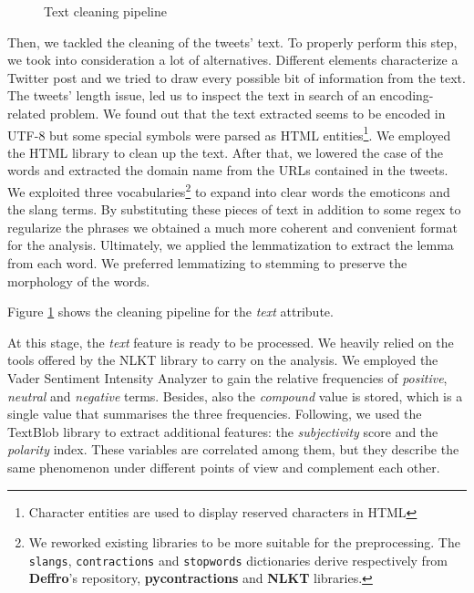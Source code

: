 \documentclass[conference]{IEEEtran}
\begin{document}
\begin{figure}[h]
        \centering
        
        \caption{Text cleaning pipeline}
        \label{fig:cleaning_schema}
\end{figure}
Then, we tackled the cleaning of the tweets' text. To properly perform this step, we took into consideration a lot of alternatives. Different elements characterize a Twitter post and we tried to draw every possible bit of information from the text. The tweets' length issue, led us to inspect the text in search of an encoding-related problem. We found out that the text extracted seems to be encoded in UTF-8\cite{utf8} but some special symbols were parsed as HTML entities\footnote{Character entities are used to display reserved characters in HTML}. We employed the HTML library to clean up the text. After that, we lowered the case of the words and extracted the domain name from the URLs contained in the tweets. We exploited three vocabularies\footnote{{We reworked existing libraries to be more suitable for the preprocessing. The \texttt{slangs}, \texttt{contractions} and \texttt{stopwords} dictionaries derive respectively from \textbf{Deffro}'s repository\cite{deffro}, \textbf{pycontractions} and \textbf{NLKT} libraries.}} to expand into clear words the emoticons and the slang terms. By substituting these pieces of text in addition to some regex to regularize the phrases we obtained a much more coherent and convenient format for the analysis. Ultimately, we applied the lemmatization\cite{lemmatization} to extract the lemma from each word. We preferred lemmatizing to stemming\cite{stemming} to preserve the morphology of the words\cite{stemmingVSlemmatizing}.

Figure \ref{fig:cleaning_schema} shows the cleaning pipeline for the \textit{text} attribute.

At this stage, the \textit{text} feature is ready to be processed. We heavily relied on the tools offered by the NLKT library\cite{nlkt} to carry on the analysis. We employed the Vader Sentiment Intensity Analyzer\cite{vader} to gain the relative frequencies of \textit{positive}, \textit{neutral} and \textit{negative} terms. Besides, also the \textit{compound} value is stored, which is a single value that summarises the three frequencies. Following, we used the TextBlob library\cite{textblob} to extract additional features: the \textit{subjectivity} score and the \textit{polarity} index. These variables are correlated among them, but they describe the same phenomenon under different points of view and complement each other.
\end{document}

